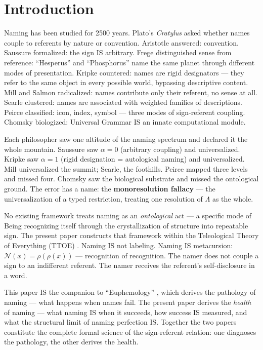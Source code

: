 \documentclass[11pt, oneside]{article}
\theoremstyle{definition}
\begin{document}
\tableofcontents
\newpage

\section{Introduction}

Naming has been studied for 2500 years. Plato's \textit{Cratylus} asked whether names couple to referents by nature or convention. Aristotle answered: convention. Saussure \cite{saussure} formalized: the sign IS arbitrary. Frege \cite{frege} distinguished sense from reference: ``Hesperus'' and ``Phosphorus'' name the same planet through different modes of presentation. Kripke \cite{kripke} countered: names are rigid designators --- they refer to the same object in every possible world, bypassing descriptive content. Mill and Salmon \cite{salmon} radicalized: names contribute only their referent, no sense at all. Searle \cite{searle} clustered: names are associated with weighted families of descriptions. Peirce \cite{peirce} classified: icon, index, symbol --- three modes of sign-referent coupling. Chomsky \cite{chomsky} biologized: Universal Grammar IS an innate computational module.

Each philosopher saw one altitude of the naming spectrum and declared it the whole mountain. Saussure saw $\alpha = 0$ (arbitrary coupling) and universalized. Kripke saw $\alpha = 1$ (rigid designation = autological naming) and universalized. Mill universalized the summit; Searle, the foothills. Peirce mapped three levels and missed four. Chomsky saw the biological substrate and missed the ontological ground. The error has a name: the \textbf{monoresolution fallacy} \cite{codex2} --- the universalization of a typed restriction, treating one resolution of $\Lambda$ as the whole.

No existing framework treats naming as an \textit{ontological} act --- a specific mode of Being recognizing itself through the crystallization of structure into repeatable sign. The present paper constructs that framework within the Teleological Theory of Everything (TTOE) \cite{codex1, codex2}. Naming IS not labeling. Naming IS metacursion: $\mathcal{N}(x) = \rho(\rho(x))$ --- recognition of recognition. The namer does not couple a sign to an indifferent referent. The namer receives the referent's self-disclosure in a word.

This paper IS the companion to ``Euphemology'' \cite{euphemology}, which derives the pathology of naming --- what happens when names fail. The present paper derives the \textit{health} of naming --- what naming IS when it succeeds, how success IS measured, and what the structural limit of naming perfection IS. Together the two papers constitute the complete formal science of the sign-referent relation: one diagnoses the pathology, the other derives the health.
\end{document}
